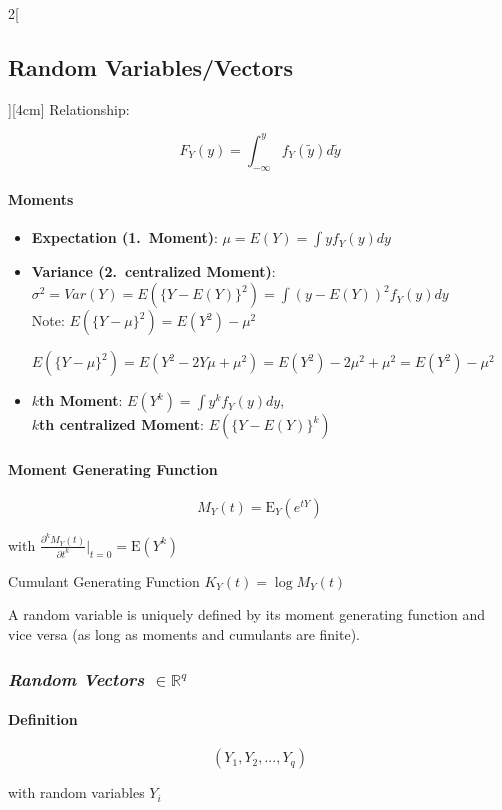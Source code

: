 \documentclass[8pt]{extarticle}
\begin{document}
\begin{multicols}{2}[\subsection{Random Variables/Vectors}][4cm]
Relationship:

$$F_Y(y) = \int_{-\infty}^{y} f_Y(\tilde{y})d\tilde{y}$$



\paragraph{Moments}

\begin{itemize}
\item \textbf{Expectation (1.\ Moment)}: $\mu = E(Y) = \int y f_Y(y)dy$
\item \textbf{Variance (2.\ centralized Moment)}: $\sigma^2 = Var(Y) = E(\{Y-E(Y)\}^2) = \int (y - E(Y))^2 f_Y(y) dy$ \\
Note: $E(\{Y-\mu\}^2) = E(Y^2) - \mu^2$
\begin{Proof}
$E(\{Y-\mu\}^2) = E(Y^2 - 2Y\mu + \mu^2) = E(Y^2) - 2\mu^2 + \mu^2 = E(Y^2) - \mu^2$
\end{Proof}
\item \textbf{$k$th Moment}: $E(Y^k) = \int y^k f_Y(y) dy$,\\ \textbf{$k$th centralized Moment}: $E(\{Y-E(Y)\}^k)$
\end{itemize}

\paragraph{Moment Generating Function }

$$M_Y(t) = \mathrm{E}_Y(e^{tY})$$

with $\frac{\partial^kM_Y(t)}{\partial t^k} \bigg|_{t = 0} = \mathrm{E}(Y^k)$ 

Cumulant Generating Function $K_Y(t) = \log M_Y(t)$

\noindent A random variable is uniquely defined by its moment generating function and vice versa (as long as moments and cumulants are finite).
  
\subsubsection*{\textit{Random Vectors $\in \mathbb{R}^q$}}

\paragraph{Definition}

$$(Y_1,Y_2,...,Y_q)$$ 

with random variables $Y_i$ 


\end{multicols}
\end{document}
